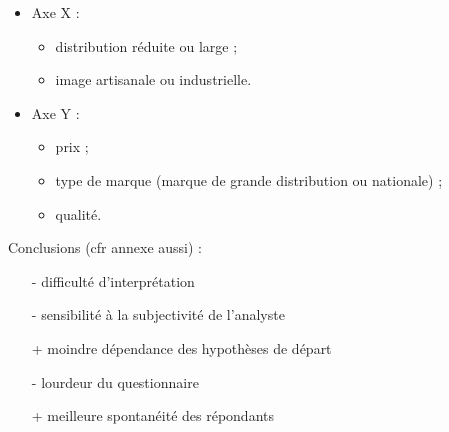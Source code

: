 		\begin{itemize}
			\item Axe X : 

			\begin{itemize}
				\item distribution réduite ou large ;
				\item image artisanale ou industrielle.
			\end{itemize}
			
			\item Axe Y :
			\begin{itemize}
				\item prix ;
				\item type de marque (marque de grande distribution ou nationale) ;
				\item qualité.
			\end{itemize}

		\end{itemize}
		\n
\begin{comment}		
		\underline{Avantages de la méthode} :
		
		\begin{itemize}
			\item ??
			\item le consommateur n'est pas obligé de se justifier, résultats plus cohérents ;
			\item ??
			\item intérêt stratégique : on peut identifier la concurrence immédiate (les marques les plus proches) ;
			\item si on n'est aucun des acteurs, on peut identifier un produit voulant rentrer sur le marché (ex : marque artisanale et qualité moindre dans le schéma précédent ; c'est une niche vide).
		\end{itemize}
		
		\underline{Désavantages} : 
		\begin{itemize}
			\item ???
			\item parfois impossible d'interpréter des écarts
		\end{itemize}
\end{comment}
		Conclusions (cfr annexe aussi) :
		
		\begin{itemize}
			\item[-] difficulté d'interprétation
			\item[-] sensibilité à la subjectivité de l'analyste
			\item[+] moindre dépendance des hypothèses de départ
			\item[-] lourdeur du questionnaire
			\item[+] meilleure spontanéité des répondants
		\end{itemize}
		
